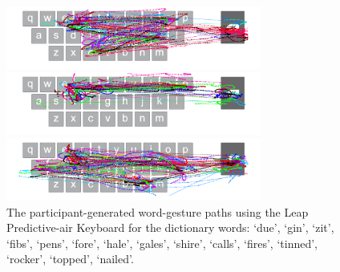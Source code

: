 \begin{figure}[t]
	\begin{minipage}[t]{8in}
	\hspace{-20pt}
	\begin{minipage}[t]{3.1in}
		\includegraphics[width=3.3in]{Figures/fig_rocker_paths}
	\end{minipage}
	\begin{minipage}[t]{3in}
		\includegraphics[width=3.3in]{Figures/fig_topped_paths}
	\end{minipage}
	\end{minipage}
	
	\begin{minipage}[t]{8in}
	\hspace{-20pt}
	\begin{minipage}[t]{3.1in}
		\includegraphics[width=3.3in]{Figures/fig_nailed_paths}
	\end{minipage}
	\end{minipage}
	\caption[User Generated Paths for the Leap Predictive-air Keyboard]{The participant-generated word-gesture paths using the Leap Predictive-air Keyboard for the dictionary words: `due', `gin', `zit', `fibs', `pens', `fore', `hale', `gales', `shire', `calls', `fires', `tinned', `rocker', `topped', `nailed'.}
\end{figure}

\clearpage

